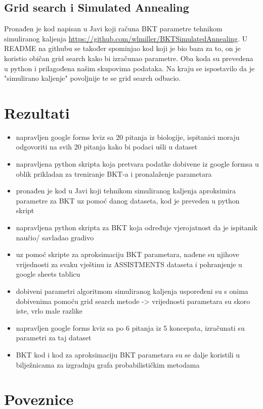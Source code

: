 \documentclass[times, utf8,projekt]{fer}
\begin{document}
\subsection{Grid search i Simulated Annealing}
Pronađen je kod napisan u Javi koji računa BKT parametre tehnikom simuliranog kaljenja \url{https://github.com/wlmiller/BKTSimulatedAnnealing}. U README na githubu se također spominjao kod koji je bio baza za to, on je koristio običan grid search kako bi izračunao parametre. Oba koda su prevedena u python i prilagođena našim skupovima podataka. Na kraju se ispostavilo da je "simulirano kaljenje" povoljnije te se grid search odbacio.
\section{Rezultati}
\begin{itemize}
	\item napravljen google forms kviz sa 20 pitanja iz biologije, ispitanici moraju odgovoriti na svih 20 pitanja kako bi podaci ušli u dataset
	\item napravljena python skripta koja pretvara podatke dobivene iz google formsa u oblik prikladan za treniranje BKT-a i pronalaženje parametara
	\item pronađen je kod u Javi koji tehnikom simuliranog kaljenja aproksimira parametre za BKT uz pomoć danog dataseta, kod je preveden u python skript
	\item napravljena python skripta za BKT koja određuje vjerojatnost da je ispitanik naučio/  savladao gradivo
	\item uz pomoć skripte za aproksimaciju BKT parametara, nađene su njihove vrijednosti za svaku vještinu iz ASSISTMENTS dataseta i pohranjenje u google sheets tablicu
	\item dobiveni parametri algoritmom simuliranog kaljenja uspoređeni su s onima dobivenima pomoću grid search metode -> vrijednosti parametara su skoro iste, vrlo male razlike
	\item napravljen google forms kviz sa po 6 pitanja iz 5 koncepata, izračunati su parametri za taj dataset
	\item BKT kod i kod za aproksimaciju BKT parametara su se dalje koristili u bilježnicama za izgradnju grafa probabilističkim metodama
	
\end{itemize}
\section{Poveznice}
\end{document}
